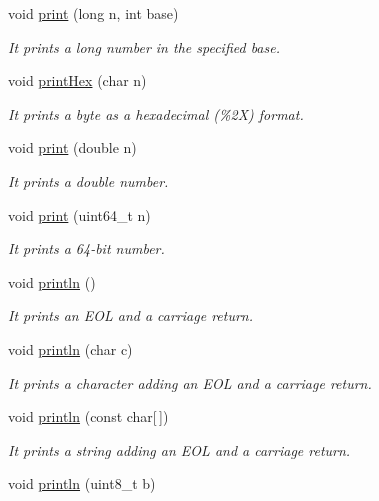 \begin{DoxyCompactItemize}
void \hyperlink{class_wasp_u_s_b_af3012847997947e01e9864125769f294}{print} (long n, int base)
\begin{DoxyCompactList}\small\item\em It prints a long number in the specified base. \end{DoxyCompactList}\item 
void \hyperlink{class_wasp_u_s_b_ad41096946034b6704b5ea7d50476afb3}{print\+Hex} (char n)
\begin{DoxyCompactList}\small\item\em It prints a byte as a hexadecimal (\%2X) format. \end{DoxyCompactList}\item 
void \hyperlink{class_wasp_u_s_b_a1f6c618fa2dd59988d4dd502775bc904}{print} (double n)
\begin{DoxyCompactList}\small\item\em It prints a double number. \end{DoxyCompactList}\item 
void \hyperlink{class_wasp_u_s_b_a581e7c5abeab6944be18cdf75025428e}{print} (uint64\+\_\+t n)
\begin{DoxyCompactList}\small\item\em It prints a 64-\/bit number. \end{DoxyCompactList}\item 
void \hyperlink{class_wasp_u_s_b_ad40be5131f94c3cc0e273cd93bf17ae5}{println} ()
\begin{DoxyCompactList}\small\item\em It prints an E\+OL and a carriage return. \end{DoxyCompactList}\item 
void \hyperlink{class_wasp_u_s_b_a4a237cb192a12e71e2cd3e2f95e60248}{println} (char c)
\begin{DoxyCompactList}\small\item\em It prints a character adding an E\+OL and a carriage return. \end{DoxyCompactList}\item 
void \hyperlink{class_wasp_u_s_b_a5707c6972428dca29b158b6004b7e1c6}{println} (const char\mbox{[}$\,$\mbox{]})
\begin{DoxyCompactList}\small\item\em It prints a string adding an E\+OL and a carriage return. \end{DoxyCompactList}\item 
void \hyperlink{class_wasp_u_s_b_aee211c527c8a9b8debbc4c944b794cb4}{println} (uint8\+\_\+t b)

\end{DoxyCompactItemize}
